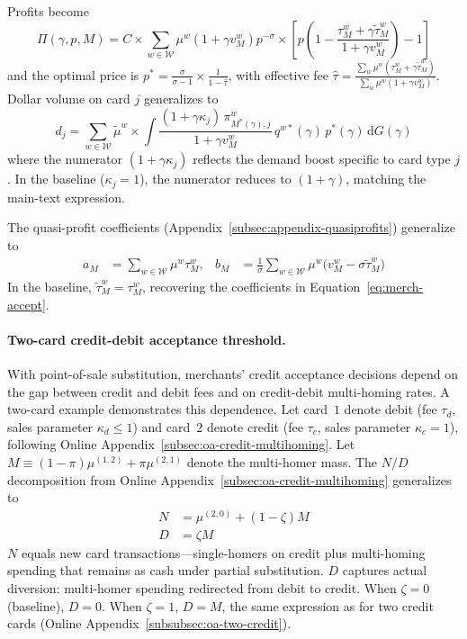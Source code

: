 \documentclass[main.tex]{subfiles}
\begin{document}
Profits become
\begin{equation}
\Pi\left(\gamma,p,M\right) = C \times \sum_{w\in\mathcal{W}}\mu^{w}\left(1+\gamma v_{M}^{w}\right)p^{-\sigma}\times\left[p\left(1-\frac{\tau_{M}^{w}+\gamma\tilde{\tau}_{M}^{w}}{1+\gamma v_{M}^{w}}\right)-1\right]
\end{equation}
and the optimal price is $p^{*}=\frac{\sigma}{\sigma-1}\times\frac{1}{1-\hat{\tau}}$, with effective fee
$\hat{\tau}=\frac{\sum_w\mu^{w}(\tau_{M}^{w}+\gamma\tilde{\tau}_{M}^{w})}{\sum_w\mu^{w}(1+\gamma v_{M}^{w})}$.
Dollar volume on card $j$ generalizes to
\begin{equation}
d_j = \sum_{w\in\mathcal{W}} \tilde{\mu}^w \times \int \frac{(1+\gamma\kappa_j)\,\pi^w_{M^*(\gamma),j}}{1+\gamma v_M^w}\, q^{w*}(\gamma)\, p^*(\gamma) \,\mathrm{d}G(\gamma) \label{eq:dollars-kappa}
\end{equation}
where the numerator $(1+\gamma\kappa_j)$ reflects the demand boost specific to card type $j$.
In the baseline ($\kappa_j=1$), the numerator reduces to $(1+\gamma)$, matching the main-text expression.

The quasi-profit coefficients (Appendix~\ref{subsec:appendix-quasiprofits}) generalize to
\begin{align}
a_M &= \sum_{w\in\mathcal{W}} \mu^w \tau_M^w, &
b_M &= \frac{1}{\sigma}\sum_{w\in\mathcal{W}} \mu^w \bigl(v_M^w - \sigma\tilde{\tau}_M^w\bigr)
\end{align}
In the baseline, $\tilde{\tau}_M^w = \tau_M^w$, recovering the coefficients in Equation~\ref{eq:merch-accept}.

\paragraph{Two-card credit-debit acceptance threshold.}
With point-of-sale substitution, merchants' credit acceptance decisions depend on the gap between credit and debit fees and on credit-debit multi-homing rates.
A two-card example demonstrates this dependence.
Let card~$1$ denote debit (fee $\tau_d$, sales parameter $\kappa_d\leq1$) and card~$2$ denote credit (fee $\tau_c$, sales parameter $\kappa_c = 1$), following Online Appendix~\ref{subsec:oa-credit-multihoming}.
Let $M \equiv (1-\pi)\mu^{(1,2)} + \pi\mu^{(2,1)}$ denote the multi-homer mass.
The $N$/$D$ decomposition from Online Appendix~\ref{subsec:oa-credit-multihoming} generalizes to
\begin{align*}
N &= \mu^{(2,0)} + (1-\zeta)M \\
D &= \zeta M
\end{align*}
$N$ equals new card transactions---single-homers on credit plus multi-homing spending that remains as cash under partial substitution.
$D$ captures actual diversion: multi-homer spending redirected from debit to credit.
When $\zeta = 0$ (baseline), $D = 0$.
When $\zeta = 1$, $D = M$, the same expression as for two credit cards (Online Appendix~\ref{subsubsec:oa-two-credit}).
\end{document}
